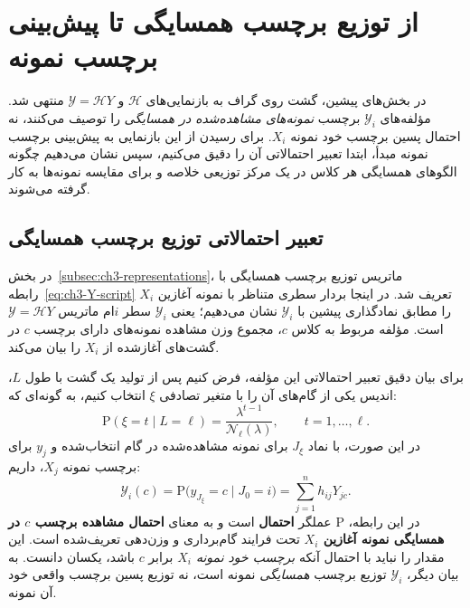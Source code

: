 \section{از توزیع برچسب همسایگی تا پیش‌بینی برچسب نمونه}
\label{sec:ch3-neighborhood-to-label-prediction}
در بخش‌های پیشین، گشت روی گراف به بازنمایی‌های
$\mathscr H$ و $\mathscr Y=\mathscr H Y$ منتهی شد.
مؤلفه‌های $\mathscr Y_i$ برچسب \emph{نمونه‌های مشاهده‌شده در همسایگی}
را توصیف می‌کنند، نه احتمال پسین برچسب خود نمونه $X_i$.
برای رسیدن از این بازنمایی به پیش‌بینی برچسب نمونه مبدأ،
ابتدا تعبیر احتمالاتی آن را دقیق می‌کنیم،
سپس نشان می‌دهیم چگونه الگوهای همسایگی هر کلاس
در یک مرکز توزیعی خلاصه و برای مقایسه نمونه‌ها به کار گرفته می‌شوند.

\subsection{تعبیر احتمالاتی توزیع برچسب همسایگی}
\label{subsec:ch3-label-neighborhood-interpretation}

در بخش~\ref{subsec:ch3-representations}، ماتریس توزیع برچسب همسایگی با رابطه~\eqref{eq:ch3-Y-script} تعریف شد. در اینجا بردار سطری متناظر با نمونه آغازین $X_i$ را مطابق نمادگذاری پیشین با $\mathscr Y_i$ نشان می‌دهیم؛ یعنی $\mathscr Y_i$ سطر $i$ام ماتریس $\mathscr Y=\mathscr H Y$ است. مؤلفه مربوط به کلاس $c$، مجموع وزن مشاهده نمونه‌های دارای برچسب $c$ در گشت‌های آغازشده از $X_i$ را بیان می‌کند.

برای بیان دقیق تعبیر احتمالاتی این مؤلفه، فرض کنیم پس از تولید یک گشت با طول $L$، اندیس یکی از گام‌های آن را با متغیر تصادفی $\xi$ انتخاب کنیم، به گونه‌ای که:
\begin{equation}\label{eq:ch3-weighted-observation-position}
\mathrm P(\xi=t\mid L=\ell)
=\frac{\lambda^{t-1}}{\mathcal N_\ell(\lambda)},
\qquad t=1,\ldots,\ell.
\end{equation}
در این صورت، با نماد $J_\xi$ برای نمونه مشاهده‌شده در گام انتخاب‌شده و $y_j$ برای برچسب نمونه $X_j$، داریم:
\begin{equation}\label{eq:ch3-label-neighborhood-probability}
\boxed{\mathscr Y_i(c)
=\mathrm P\bigl(y_{J_\xi}=c\mid J_0=i\bigr)
=\sum_{j=1}^{n}h_{ij}Y_{jc}.}
\end{equation}
در این رابطه، $\mathrm P$ عملگر \textbf{احتمال} است و به معنای \textbf{احتمال مشاهده برچسب $c$ در همسایگی نمونه آغازین $X_i$} تحت فرایند گام‌برداری و وزن‌دهی تعریف‌شده است. این مقدار را نباید با احتمال آنکه \emph{برچسب خود نمونه $X_i$} برابر $c$ باشد، یکسان دانست. به بیان دیگر، $\mathscr Y_i$ توزیع برچسب \emph{همسایگی} نمونه است، نه توزیع پسین برچسب واقعی خود آن نمونه.

